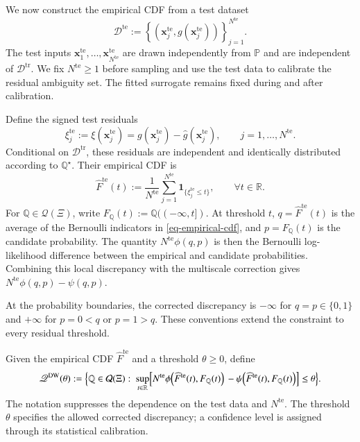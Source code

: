 \documentclass[review,11pt,3p,authoryear,nopreprintline]{elsarticle}
\begin{document}
We now construct the empirical CDF from a test dataset
\[
  \mathcal D^{\mathrm{te}}:=\left\{\left(\bm x_j^{\mathrm{te}},g(\bm x_j^{\mathrm{te}})\right)\right\}_{j=1}^{N^{\mathrm{te}}}.
\]
The test inputs $\bm x_1^{\mathrm{te}},\ldots,\bm x_{N^{\mathrm{te}}}^{\mathrm{te}}$ are drawn independently from $\mathbb P$ and are independent of $\mathcal D^{\mathrm{tr}}$. We fix $N^{\mathrm{te}}\ge1$ before sampling and use the test data to calibrate the residual ambiguity set. The fitted surrogate remains fixed during and after calibration.

Define the signed test residuals
\[
  \xi_j^{\mathrm{te}}:=\xi(\bm x_j^{\mathrm{te}})=g(\bm x_j^{\mathrm{te}})-\hat g(\bm x_j^{\mathrm{te}}),\qquad j=1,\ldots,N^{\mathrm{te}}.
\]
Conditional on $\mathcal D^{\mathrm{tr}}$, these residuals are independent and identically distributed according to $\mathbb Q^\star$. Their empirical CDF is
\begin{equation}
  \widehat F^{\mathrm{te}}(t):=\frac{1}{N^{\mathrm{te}}}\sum_{j=1}^{N^{\mathrm{te}}}\mathbf 1_{\{\xi_j^{\mathrm{te}}\le t\}},\qquad \forall t\in\mathbb R.
  \label{eq-empirical-cdf}
\end{equation}
For $\mathbb Q\in\mathcal Q(\Xi)$, write $F_{\mathbb Q}(t):=\mathbb Q(({-\infty},t])$. At threshold $t$, $q=\widehat F^{\mathrm{te}}(t)$ is the average of the Bernoulli indicators in \eqref{eq-empirical-cdf}, and $p=F_{\mathbb Q}(t)$ is the candidate probability. The quantity $N^{\mathrm{te}}\phi(q,p)$ is then the Bernoulli log-likelihood difference between the empirical and candidate probabilities. Combining this local discrepancy with the multiscale correction gives $N^{\mathrm{te}}\phi(q,p)-\psi(q,p)$.

At the probability boundaries, the corrected discrepancy is $-\infty$ for $q=p\in\{0,1\}$ and $+\infty$ for $p=0<q$ or $p=1>q$. These conventions extend the constraint to every residual threshold.

\begin{definition}
  \label{definition-dw-ambiguity-set}
  Given the empirical CDF $\widehat F^{\mathrm{te}}$ and a threshold $\theta\ge0$, define
  \begin{equation} 
      \mathscr Q^{\mathrm{DW}}(\theta):=\Bigl\{\mathbb Q\in\mathcal Q(\Xi):\ 
      \sup_{t\in\mathbb R}\Bigl[ N^{\mathrm{te}}\phi\!\left(\widehat F^{\mathrm{te}}(t),F_{\mathbb Q}(t)\right) 
       {}-\psi\!\left(\widehat F^{\mathrm{te}}(t),F_{\mathbb Q}(t)\right)\Bigr]\le\theta\Bigr\}. 
    \label{eq-cdf-ambiguity-set}
  \end{equation}
  The notation suppresses the dependence on the test data and $N^{\mathrm{te}}$. The threshold $\theta$ specifies the allowed corrected discrepancy; a confidence level is assigned through its statistical calibration.
\end{definition}
\end{document}
